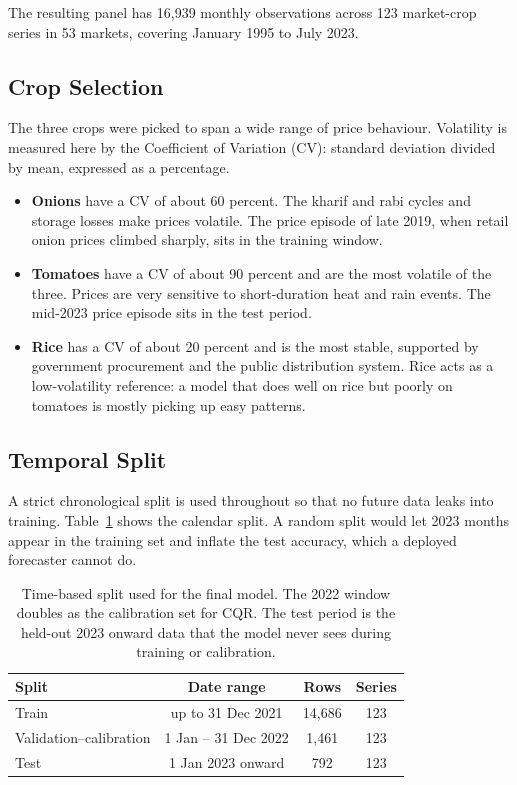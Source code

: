 \documentclass[conference,twoside]{IEEEtran}
\begin{document}
The resulting panel has 16{,}939 monthly observations across 123 market-crop series in 53 markets, covering January 1995 to July 2023.

\subsection{Crop Selection}
\label{sec:why_three}
The three crops were picked to span a wide range of price behaviour. Volatility is measured here by the Coefficient of Variation (CV): standard deviation divided by mean, expressed as a percentage.

\begin{itemize}
    \item \textbf{Onions} have a CV of about 60 percent. The kharif and rabi cycles and storage losses make prices volatile. The price episode of late 2019, when retail onion prices climbed sharply, sits in the training window.
    \item \textbf{Tomatoes} have a CV of about 90 percent and are the most volatile of the three. Prices are very sensitive to short-duration heat and rain events. The mid-2023 price episode sits in the test period.
    \item \textbf{Rice} has a CV of about 20 percent and is the most stable, supported by government procurement and the public distribution system. Rice acts as a low-volatility reference: a model that does well on rice but poorly on tomatoes is mostly picking up easy patterns.
\end{itemize}

\subsection{Temporal Split}
A strict chronological split is used throughout so that no future data leaks into training. Table~\ref{tab:split} shows the calendar split. A random split would let 2023 months appear in the training set and inflate the test accuracy, which a deployed forecaster cannot do.

\begin{table}[H]
\centering
\caption{Time-based split used for the final model. The 2022 window doubles as the calibration set for CQR. The test period is the held-out 2023 onward data that the model never sees during training or calibration.}
\label{tab:split}
\begin{tabular}{lccc}
\toprule
\textbf{Split} & \textbf{Date range} & \textbf{Rows} & \textbf{Series} \\
\midrule
Train                  & up to 31 Dec 2021        & 14{,}686 & 123 \\
Validation--calibration & 1 Jan -- 31 Dec 2022      & 1{,}461  & 123 \\
Test                   & 1 Jan 2023 onward        & 792      & 123 \\
\bottomrule
\end{tabular}
\end{table}
\end{document}
